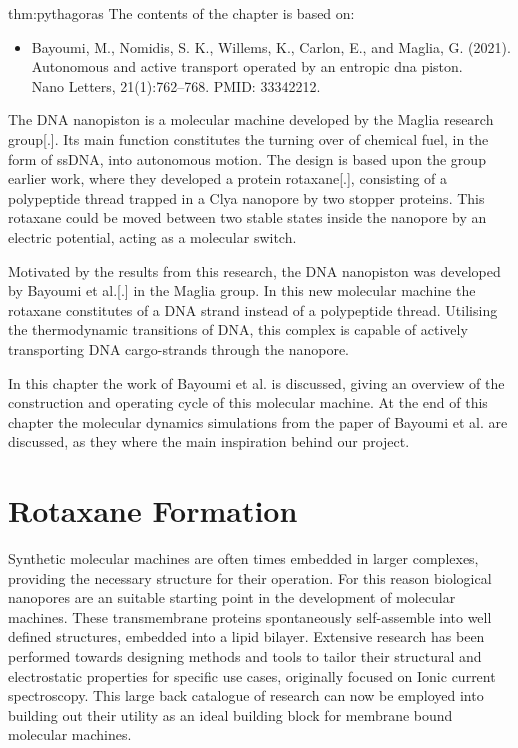 
\begin{theo}{thm:pythagoras}
  The contents of the chapter is based on:
  \vspace{-0.4cm}
  \begin{itemize}
    \item Bayoumi, M., Nomidis, S. K., Willems, K., Carlon, E., and Maglia, G. (2021).
      Autonomous and active transport operated by an entropic dna piston.\\
      Nano Letters, 21(1):762–768. PMID: 33342212.
  \end{itemize}
  \vspace{0.3cm}
\end{theo}

The DNA nanopiston is a molecular machine developed by the Maglia research group[.].  Its
main function constitutes the turning over of chemical fuel, in the form of ssDNA,  into
autonomous motion. The design is based upon the group earlier work, where they developed
a protein rotaxane[.], consisting of a polypeptide thread trapped in a Clya nanopore by
two stopper proteins. This rotaxane could be moved between two stable states inside the
nanopore by an electric potential, acting as a molecular switch.

Motivated by the results from this research, the DNA nanopiston was developed by Bayoumi
et al.[.] in the Maglia group. In this new molecular machine the rotaxane constitutes of
a DNA strand instead of a polypeptide thread. Utilising the thermodynamic transitions of
DNA, this complex is capable of actively transporting DNA cargo-strands through the
nanopore.

In this chapter the work of Bayoumi et al. is discussed, giving an overview of the
construction and operating cycle of this molecular machine.  At the end of this chapter
the molecular dynamics simulations from the paper of Bayoumi et al. are discussed, as
they where the main inspiration behind our project.

\section{Rotaxane Formation}


Synthetic molecular machines are often times embedded in larger complexes, providing the
necessary structure for their operation. For this reason biological nanopores are an
suitable starting point in the development of molecular machines. These transmembrane
proteins spontaneously self-assemble into well defined structures, embedded into a lipid
bilayer. Extensive research has been performed towards designing methods and tools to
tailor their structural and electrostatic properties for specific use cases, originally
focused on Ionic current spectroscopy. This large back catalogue of research can now be
employed into building out their utility as an ideal building block for membrane bound
molecular machines.

